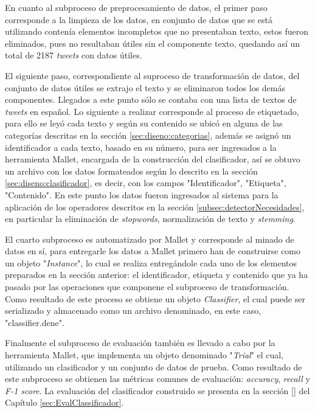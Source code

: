 En cuanto al subproceso de preprocesamiento de datos, el primer paso corresponde a la limpieza de los datos, en conjunto de datos que se está utilizando contenía elementos incompletos que no presentaban texto, estos fueron eliminados, pues no resultaban útiles sin el componente texto, quedando así un total de 2187 \textit{tweets} con datos útiles.

El siguiente paso, correspondiente al suproceso de transformación de datos, del conjunto de datos útiles se extrajo el texto y se eliminaron todos los demás componentes. Llegados a este punto sólo se contaba con una lista de textos de \textit{tweets} en español. Lo siguiente a realizar corresponde al proceso de etiquetado, para ello se leyó cada texto y según su contenido se ubicó en alguna de las categorías descritas en la sección \ref{sec:diseno:categorias}, además se asignó un identificador a cada texto, basado en su número, para ser ingresados a la herramienta Mallet, encargada de la construcción del clasificador, así se obtuvo un archivo con los datos formateados según lo descrito en la sección \ref{sec:diseno:clasificador}, es decir, con los campos "Identificador", "Etiqueta", "Contenido". En este punto los datos fueron ingresados al sistema para la aplicación de los operadores descritos en la sección \ref{subsec:detectorNecesidades}, en particular la eliminación de \textit{stopwords}, normalización de texto y \textit{stemming}.

El cuarto subproceso es automatizado por Mallet y corresponde al minado de datos en sí, para entregarle los datos a Mallet primero han de construirse como un objeto "\textit{Instance}", lo cual se realiza entregándole cada uno de los elementos preparados en la sección anterior: el identificador, etiqueta y contenido que ya ha pasado por las operaciones que componene el subproceso de transformación. Como resultado de este proceso se obtiene un objeto \textit{Classifier}, el cual puede ser serializado y almacenado como un archivo denominado, en este caso, "classifier.dene". 

Finalmente el subproceso de evaluación también es llevado a cabo por la herramienta Mallet, que implementa un objeto denominado "\textit{Trial}" el cual, utilizando un clasificador y un conjunto de datos de prueba. Como resultado de este subproceso se obtienen las métricas comunes de evaluación: \textit{accuracy}, \textit{recall} y \textit{F-1 score}. La evaluación del clasificador construido se presenta en la sección \ref{} del Capítulo \ref{sec:EvalClassificador}. 

